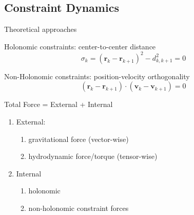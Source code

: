 \documentclass[t,presentation]{beamer}
\begin{document}
\subsection{Constraint Dynamics}
\label{sec:org16e9670}
\begin{frame}[label={sec:org537322b}]{Theoretical approaches}
\begin{block}{Holonomic constraints: center-to-center distance}
\begin{equation}
\sigma_{k}  =\left(\bm{r}_{k}-\bm{r}_{k+1}\right)^{2}-d_{k,k+1}^{2}=0
\end{equation}
\end{block}
\begin{block}{Non-Holonomic constraints: position-velocity orthogonality}
\begin{equation}
\left(\bm{r}_{k}-\bm{r}_{k+1}\right)\cdot\left(\bm{v}_{k}-\bm{v}_{k+1}\right)=0\label{eq:orthogonal}
\end{equation}
\end{block}
\begin{block}{Total Force = External + Internal}
\begin{enumerate}
\item External:
\begin{enumerate}
\item gravitational force (vector-wise)
\item hydrodynamic force/torque (tensor-wise)
\end{enumerate}
\item Internal
\begin{enumerate}
\item holonomic
\item non-holonomic constraint forces
\end{enumerate}
\end{enumerate}
\end{block}
\end{frame}
\end{document}
